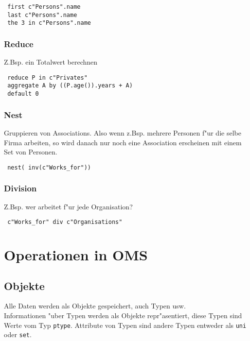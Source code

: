 \documentclass[german, 10pt, a4paper, twocolumn]{scrartcl}
\theoremstyle{definition}
\theoremstyle{remark}
\theoremstyle{example}
\begin{document}
\begin{verbatim}
 first c"Persons".name
 last c"Persons".name
 the 3 in c"Persons".name
\end{verbatim}

\subsubsection{Reduce}

Z.Bsp. ein Totalwert berechnen

\begin{verbatim}
 reduce P in c"Privates"
 aggregate A by ((P.age()).years + A)
 default 0
\end{verbatim}

\subsubsection{Nest}

Gruppieren von Associations. Also wenn z.Bsp. mehrere Personen f"ur die selbe Firma arbeiten, so wird danach nur noch eine Association erscheinen mit einem Set von Personen.

\begin{verbatim}
 nest( inv(c"Works_for"))
\end{verbatim}

\subsubsection{Division}

Z.Bsp. wer arbeitet f"ur jede Organisation?

\begin{verbatim}
 c"Works_for" div c"Organisations"
\end{verbatim}

\section{Operationen in OMS}

\subsection{Objekte}

Alle Daten werden als Objekte gespeichert, auch Typen usw.\\

Informationen "uber Typen werden als Objekte repr"asentiert, diese Typen sind Werte vom Typ \texttt{ptype}. Attribute von Typen sind andere Typen entweder als \texttt{uni} oder \texttt{set}.
\end{document}
